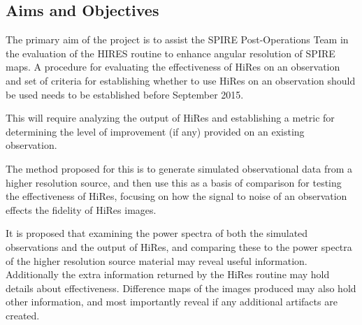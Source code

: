 \subsection{Aims and Objectives}

The primary aim of the project is to assist the SPIRE Post-Operations Team in the evaluation of the HIRES routine to enhance angular resolution of SPIRE maps. A procedure for evaluating the effectiveness of HiRes on an observation and set of criteria for establishing whether to use HiRes on an observation should be used needs to be established before September 2015.

This will require analyzing the output of HiRes and establishing a metric for determining the level of improvement (if any) provided on an existing observation.

The method proposed for this is to generate simulated observational data from a higher resolution source, and then use this as a basis of comparison for testing the effectiveness of HiRes, focusing on how the signal to noise of an observation effects the fidelity of HiRes images.

It is proposed that examining the power spectra of both the simulated observations and the output of HiRes, and comparing these to the power spectra of the higher resolution source material may reveal useful information. Additionally the extra information returned by the HiRes routine may hold details about effectiveness. Difference maps of the images produced may also hold other information, and most importantly reveal if any additional artifacts are created.
